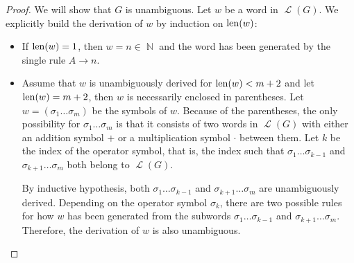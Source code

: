 \begin{proof}
  We will show that \( G \) is unambiguous. Let \( w \) be a word in \( \mscrL(G) \). We explicitly build the derivation of \( w \) by induction on \( \operatorname{len}(w) \):
  \begin{itemize}
    \item If \( \operatorname{len}(w) = 1 \), then \( w = n \in \BbbN \) and the word has been generated by the single rule \( A \to n \).

    \item Assume that \( w \) is unambiguously derived for \( \operatorname{len}(w) < m + 2 \) and let \( \operatorname{len}(w) = m + 2 \), then \( w \) is necessarily enclosed in parentheses. Let \( w = ( \sigma_1 \ldots \sigma_m ) \) be the symbols of \( w \). Because of the parentheses, the only possibility for \( \sigma_1 \ldots \sigma_m \) is that it consists of two words in \( \mscrL(G) \) with either an addition symbol \( + \) or a multiplication symbol \( \cdot \) between them. Let \( k \) be the index of the operator symbol, that is, the index such that \( \sigma_1 \ldots \sigma_{k-1} \) and \( \sigma_{k+1} \ldots \sigma_m \) both belong to \( \mscrL(G) \).

    By inductive hypothesis, both \( \sigma_1 \ldots \sigma_{k-1} \) and \( \sigma_{k+1} \ldots \sigma_m \) are unambiguously derived. Depending on the operator symbol \( \sigma_k \), there are two possible rules for how \( w \) has been generated from the subwords \( \sigma_1 \ldots \sigma_{k-1} \) and \( \sigma_{k+1} \ldots \sigma_m \). Therefore, the derivation of \( w \) is also unambiguous.
  \end{itemize}
\end{proof}
